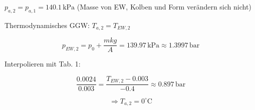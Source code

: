 

\item[b)] $p_{a,2} = p_{a,1} = 140.1 \, \text{kPa}$ \hspace{1cm} (Masse von EW, Kolben und Form verändern sich nicht)
    
    Thermodynamisches GGW: $T_{a,2} = T_{EW,2}$
    
    \[
    p_{EW,2} = p_0 + \frac{m k g}{A} = 139.97 \, \text{kPa} \approx 1.3997 \, \text{bar}
    \]
    
    Interpolieren mit Tab. 1:
    
    \[
    \frac{0.0024}{0.003} = \frac{T_{EW,2} - 0.003}{-0.4} \approx 0.897 \, \text{bar}
    \]
    
    \[
    \Rightarrow T_{a,2} = 0^\circ \text{C}
    \]